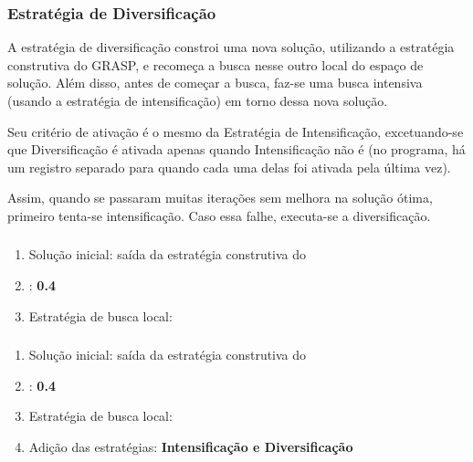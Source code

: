 \subsubsection{Estratégia de Diversificação}
\label{subsubsection:tabu-diversification}

A estratégia de diversificação constroi uma nova solução, utilizando a estratégia construtiva do GRASP, e recomeça a busca nesse outro local do espaço de solução. Além disso, antes de começar a busca, faz-se uma busca intensiva (usando a estratégia de intensificação) em torno dessa nova solução.

Seu critério de ativação é o mesmo da Estratégia de Intensificação, excetuando-se que Diversificação é ativada apenas quando Intensificação não é (no programa, há um registro separado para quando cada uma delas foi ativada pela última vez).

Assim, quando se passaram muitas iterações sem melhora na solução ótima, primeiro tenta-se intensificação. Caso essa falhe, executa-se a diversificação.

\subsubsection{\tabuVanilla}
\label{subsubsection:tabu-vanilla}

\begin{enumerate}
    \item Solução inicial: saída da estratégia construtiva do \grasp
    \item \tenureRatio: \textbf{0.4}
    \item Estratégia de busca local: \textbf{\bestImproving}
\end{enumerate}

\subsubsection{\tabuMod}
\label{subsubsection:tabu-mod}

\begin{enumerate}
    \item Solução inicial: saída da estratégia construtiva do \grasp
    \item \tenureRatio: \textbf{0.4}
    \item Estratégia de busca local: \textbf{\bestImproving}
    \item Adição das estratégias: \textbf{Intensificação e Diversificação}
\end{enumerate}
